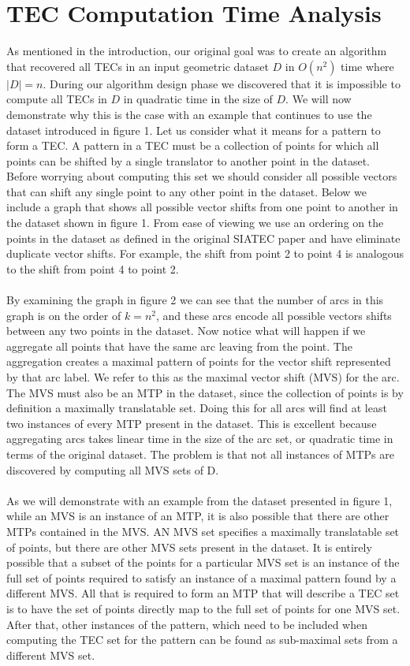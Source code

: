 \documentclass[12pt]{article}
\begin{document}
\section{TEC Computation Time Analysis}
As mentioned in the introduction, our original goal was to create an algorithm that recovered all TECs in an input geometric dataset $D$ in $O(n^2)$ time where $|D| = n$. During our algorithm design phase we discovered that it is impossible to compute all TECs in $D$ in quadratic time in the size of $D$. We will now demonstrate why this is the case with an example that continues to use the dataset introduced in figure 1. Let us consider what it means for a pattern to form a TEC. A pattern in a TEC must be a collection of points for which all points can be shifted by a single translator to another point in the dataset. Before worrying about computing this set we should consider all possible vectors that can shift any single point to any other point in the dataset. Below we include a graph that shows all possible vector shifts from one point to another in the dataset shown in figure 1. From ease of viewing we use an ordering on the points in the dataset as defined in the original SIATEC paper \cite{SIATEC_Paper} and have eliminate duplicate vector shifts. For example, the shift from point 2 to point 4 is analogous to the shift from point 4 to point 2.
\\
\\By examining the graph in figure 2 we can see that the number of arcs in this graph is on the order of $k = n^2$, and these arcs encode all possible vectors shifts between any two points in the dataset. Now notice what will happen if we aggregate all points that have the same arc leaving from the point. The aggregation creates a maximal pattern of points for the vector shift represented by that arc label. We refer to this as the maximal vector shift (MVS) for the arc. The MVS must also be an MTP in the dataset, since the collection of points is by definition a maximally translatable set. Doing this for all arcs will find at least two instances of every MTP present in the dataset. This is excellent because aggregating arcs takes linear time in the size of the arc set, or quadratic time in terms of the original dataset. The problem is that not all instances of MTPs are discovered by computing all MVS sets of D.
\\
\\ As we will demonstrate with an example from the dataset presented in figure 1, while an MVS is an instance of an MTP, it is also possible that there are other MTPs contained in the MVS. AN MVS set specifies a maximally translatable set of points, but there are other MVS sets present in the dataset. It is entirely possible that a subset of the points for a particular MVS set is an instance of the full set of points required to satisfy an instance of a maximal pattern found by a different MVS. All that is required to form an MTP that will describe a TEC set is to have the set of points directly map to the full set of points for one MVS set. After that, other instances of the pattern, which need to be included when computing the TEC set for the pattern can be found as sub-maximal sets from a different MVS set.
\end{document}
